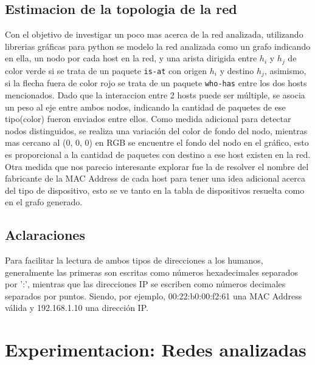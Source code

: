 \subsection{Estimacion de la topologia de la red}
Con el objetivo de investigar un poco mas acerca de la red analizada, utilizando librerias gr\'aficas para python se modelo la red analizada como un grafo indicando en ella, un nodo por cada host en la red, y una arista dirigida entre $h_i$ y $h_j$ de color {\color{green}verde} si se trata de un paquete \texttt{is-at} con origen $h_i$ y destino $h_j$, asimismo, si la flecha fuera de color {\color{red}rojo} se trata de un paquete \texttt{who-has} entre los dos hosts mencionados. Dado que la interaccion entre 2 hosts puede ser m\'ultiple, se asocia un peso al eje entre ambos nodos, indicando la cantidad de paquetes de ese tipo(color) fueron enviados entre ellos. Como medida adicional para detectar nodos distinguidos, se realiza una variaci\'on del color de fondo del nodo, mientras mas cercano al (0, 0, 0) en RGB se encuentre el fondo del nodo en el gr\'afico, esto es proporcional a la cantidad de paquetes con destino a ese host existen en la red. Otra medida que nos parecio interesante explorar fue la de resolver el nombre del fabricante de la MAC Address de cada host para tener una idea adicional acerca del tipo de dispositivo, esto se ve tanto en la tabla de dispositivos resuelta como en el grafo generado.

\subsection{Aclaraciones}
Para facilitar la lectura de ambos tipos de direcciones a los humanos, generalmente las primeras son escritas como números hexadecimales separados por ':', mientras que las direcciones IP se escriben como números decimales separados por puntos. Siendo, por ejemplo, 00:22:b0:00:f2:61 una MAC Address válida y 192.168.1.10 una dirección IP.

\section{Experimentacion: Redes analizadas}
 
 
% 
% 




